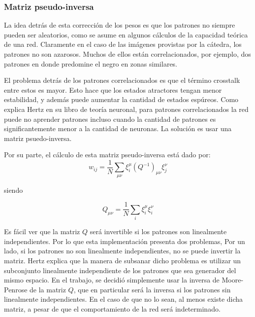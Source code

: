 \documentclass[%
    final,
    reprint,
    notitlepage,
    narroweqnarray,
    inline,
    twoside,
    invited
    ]{ieee}
\begin{document}
\subsubsection{Matriz pseudo-inversa}

\par La idea detrás de esta corrección de los pesos es que los patrones no siempre pueden ser 
aleatorios, como se asume en algunos cálculos de la capacidad teórica de una red. Claramente 
en el caso de las imágenes provistas por la cátedra, los patrones no son azarosos. Muchos de ellos están correlacionados, por ejemplo, dos patrones en donde predomine el negro en zonas similares. \\
\par El problema detrás de los patrones correlacionados es que el término crosstalk entre estos 
es mayor. Esto hace que los estados atractores tengan menor estabilidad, y además puede aumentar la cantidad de estados espúreos. Como explica Hertz en su libro de teoría neuronal, para patrones correlacionados la red puede no aprender patrones incluso cuando la cantidad de patrones es significantemente menor a la cantidad de neuronas. La solución es usar una 
matriz psuedo-inversa.

\par Por su parte, el cálculo de esta matriz pseudo-inversa está dado por:\\

\begin{equation}
w_{ij}=\frac{1}{N}\sum_{\mu \nu} \xi_i^{\mu}(Q^{-1})_{\mu \nu}  \xi_j^{\nu}
\end{equation}

siendo 

\begin{equation}
Q_{\mu \nu} = \frac{1}{N}\sum_{i}  \xi_i^{\mu}  \xi_i^{\nu}
\end{equation}



\par Es fácil ver que la matriz $Q$ será invertible si los patrones son linealmente independientes. 
Por lo que esta implementación presenta dos problemas, Por un lado, si los patrones no son 
linealmente independientes, no se puede invertir la matriz. Hertz explica que la manera de subsanar 
dicho problema es utilizar un subconjunto linealmente independiente de los patrones que sea generador 
del mismo espacio. En el trabajo, se decidió simplemente usar la inversa de Moore-Penrose de la matriz $Q$, 
que en particular será la inversa si los patrones sin linealmente independientes. En el caso de que no lo sean, 
al menos existe dicha matriz, a pesar de que el comportamiento de la red será indeterminado.
\end{document}
